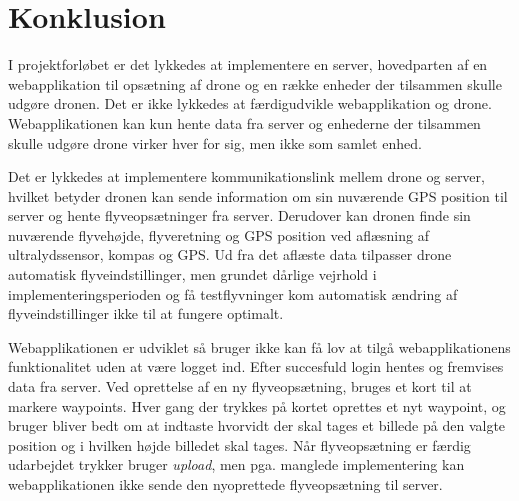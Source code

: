 \section{Konklusion}


I projektforløbet er det lykkedes at implementere en server, hovedparten af en webapplikation til opsætning af drone og en række enheder der tilsammen skulle udgøre dronen. Det er ikke lykkedes at færdigudvikle webapplikation og drone. Webapplikationen kan kun hente data fra server og enhederne der tilsammen skulle udgøre drone virker hver for sig, men ikke som samlet enhed.

Det er lykkedes at implementere kommunikationslink mellem drone og server, hvilket betyder dronen kan sende information om sin nuværende GPS position til server og hente flyveopsætninger fra server. Derudover kan dronen finde sin nuværende flyvehøjde, flyveretning og GPS position ved aflæsning af ultralydssensor, kompas og GPS. Ud fra det aflæste data tilpasser drone automatisk flyveindstillinger, men grundet dårlige vejrhold i implementeringsperioden og få testflyvninger kom automatisk ændring af flyveindstillinger ikke til at fungere optimalt.

Webapplikationen er udviklet så bruger ikke kan få lov at tilgå webapplikationens funktionalitet uden at være logget ind. Efter succesfuld login hentes og fremvises data fra server. 
Ved oprettelse af en ny flyveopsætning, bruges et kort til at markere waypoints. Hver gang der trykkes på kortet oprettes et nyt waypoint, og bruger bliver bedt om at indtaste hvorvidt der skal tages et billede på den valgte position og i hvilken højde billedet skal tages.
Når flyveopsætning er færdig udarbejdet trykker bruger \textit{upload}, men pga. manglede implementering kan webapplikationen ikke sende den nyoprettede flyveopsætning til server. 

